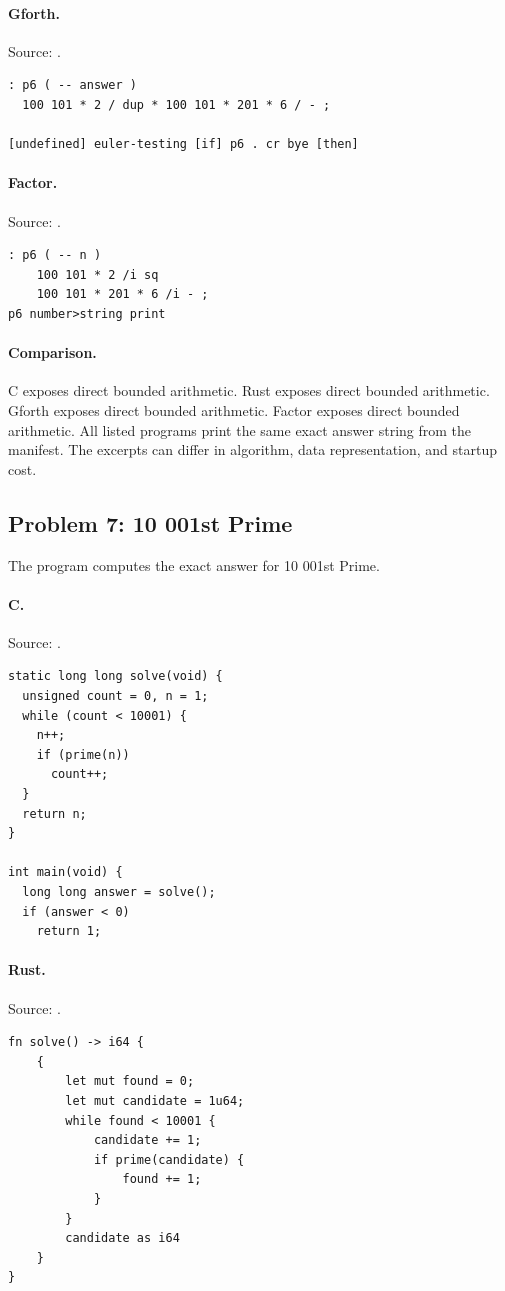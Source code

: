 \paragraph{Gforth.} Source: .
\begin{lstlisting}
: p6 ( -- answer )
  100 101 * 2 / dup * 100 101 * 201 * 6 / - ;

[undefined] euler-testing [if] p6 . cr bye [then]
\end{lstlisting}

\paragraph{Factor.} Source: .
\begin{lstlisting}
: p6 ( -- n )
    100 101 * 2 /i sq
    100 101 * 201 * 6 /i - ;
p6 number>string print
\end{lstlisting}

\paragraph{Comparison.}
C exposes direct bounded arithmetic. Rust exposes direct bounded arithmetic. Gforth exposes direct bounded arithmetic. Factor exposes direct bounded arithmetic.
All listed programs print the same exact answer string from the manifest. The excerpts can differ in algorithm, data representation, and startup cost.

\subsection{Problem 7: 10 001st Prime}
\label{walkthrough:p7}
The program computes the exact answer for 10 001st Prime.

\paragraph{C.} Source: .
\begin{lstlisting}
static long long solve(void) {
  unsigned count = 0, n = 1;
  while (count < 10001) {
    n++;
    if (prime(n))
      count++;
  }
  return n;
}

int main(void) {
  long long answer = solve();
  if (answer < 0)
    return 1;
\end{lstlisting}

\paragraph{Rust.} Source: .
\begin{lstlisting}
fn solve() -> i64 {
    {
        let mut found = 0;
        let mut candidate = 1u64;
        while found < 10001 {
            candidate += 1;
            if prime(candidate) {
                found += 1;
            }
        }
        candidate as i64
    }
}
\end{lstlisting}

